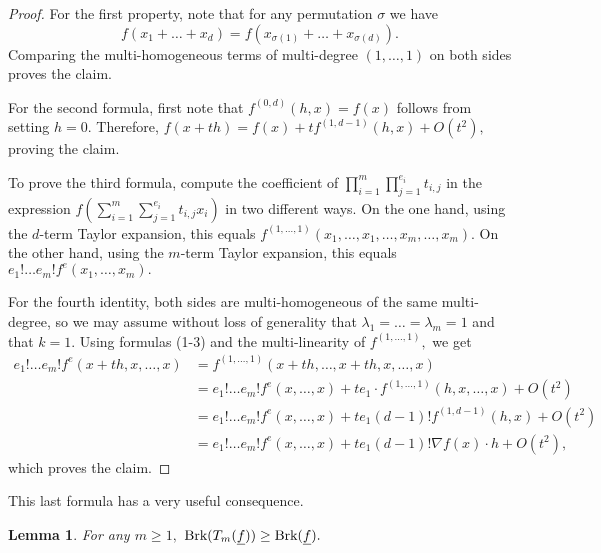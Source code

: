 \documentclass[12pt]{amsart}
\let\ul\underline
\newtheorem{lemma}[theorem]{Lemma}
\theoremstyle{definition}
\newcommand{\brk}{\textnormal{Brk}}
\let\ul\underline
\begin{document}
\begin{proof}
    For the first property, note that for any permutation $\sigma$ we have 
    $$f(x_1+\ldots+x_d) = f(x_{\sigma(1)}+\ldots+x_{\sigma(d)}).$$
    Comparing the multi-homogeneous terms of multi-degree $(1,\ldots,1)$ on both sides proves the claim.

    For the second formula, first note that $f^{(0,d)}(h,x) = f(x)$ follows from setting $h=0.$ Therefore, $f(x+th) = f(x) + t f^{(1,d-1)}(h,x) +O(t^2),$ proving the claim. 

    To prove the third formula, compute the coefficient of $\prod_{i=1}^m \prod_{j=1}^{e_i} t_{i,j}$ in the expression $f\left (\sum_{i=1}^m \sum_{j=1}^{e_i}  t_{i,j} x_i \right)$ in two different ways. On the one hand, using the $d$-term Taylor expansion, this equals $f^{(1,\ldots,1)} (x_1,\ldots,x_1,\ldots,x_m,\ldots,x_m).$ On the other hand, using the $m$-term Taylor expansion, this equals $e_1!\ldots e_m! f^e(x_1,\ldots,x_m).$

     For the fourth identity, both sides are multi-homogeneous of the same multi-degree, so we may assume without loss of generality that $\lambda_1 = \ldots = \lambda_m = 1$ and that $k=1.$ Using formulas (1-3) and the multi-linearity of $f^{(1,\ldots,1)},$ we get
    \begin{align*}
        e_1!\ldots e_m! f^e(x+th,x,\ldots,x) &= f^{(1,\ldots,1)}(x+th,\ldots,x+th,x,\ldots,x) \\
        &= e_1!\ldots e_m! f^e(x,\ldots,x) + t e_1\cdot f^{(1,\ldots,1)}(h,x,\ldots,x) + O(t^2) \\
        &= e_1!\ldots e_m! f^e(x,\ldots,x) + t e_1(d-1)! f^{(1,d-1)} (h,x) + O(t^2) \\
        &= e_1!\ldots e_m! f^e(x,\ldots,x) + t e_1(d-1)! \nabla f(x)\cdot h + O(t^2),
    \end{align*}
    which proves the claim.
\end{proof}


This last formula has a very useful consequence.

\begin{lemma}\label{lem:brk-taylor}
    For any $m\ge 1,$ $\brk(T_m(\ul{f})) \ge \brk(\ul{f}).$ 
\end{lemma}
\end{document}

